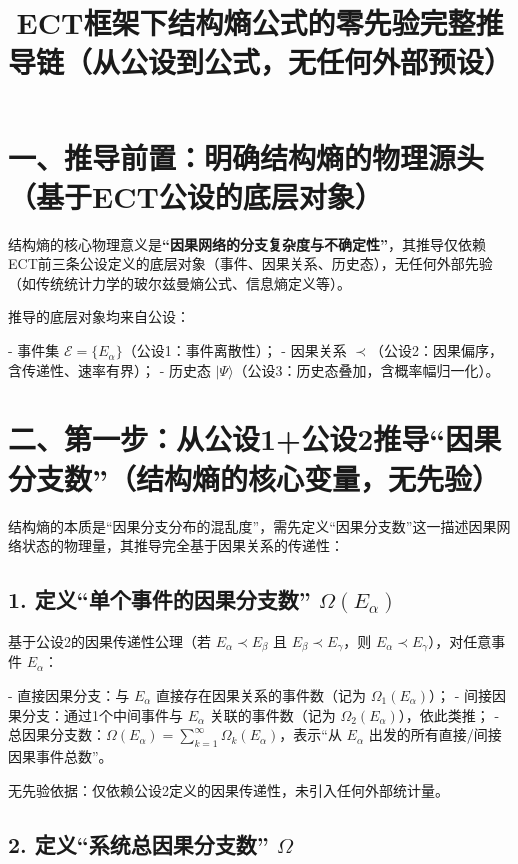 \documentclass{article}
\title{ECT框架下结构熵公式的零先验完整推导链（从公设到公式，无任何外部预设）}
\author{}
\date{}
\begin{document}
\maketitle

\section*{一、推导前置：明确结构熵的物理源头（基于ECT公设的底层对象）}

结构熵的核心物理意义是\textbf{“因果网络的分支复杂度与不确定性”}，其推导仅依赖ECT前三条公设定义的底层对象（事件、因果关系、历史态），无任何外部先验（如传统统计力学的玻尔兹曼熵公式、信息熵定义等）。

推导的底层对象均来自公设：

- 事件集 \( \mathcal{E} = \{E_\alpha\} \)（公设1：事件离散性）；
- 因果关系 \( \prec \)（公设2：因果偏序，含传递性、速率有界）；
- 历史态 \( |\Psi\rangle \)（公设3：历史态叠加，含概率幅归一化）。

\section*{二、第一步：从公设1+公设2推导“因果分支数”（结构熵的核心变量，无先验）}

结构熵的本质是“因果分支分布的混乱度”，需先定义“因果分支数”这一描述因果网络状态的物理量，其推导完全基于因果关系的传递性：

\subsection*{1. 定义“单个事件的因果分支数” \( \Omega(E_\alpha) \)}

基于公设2的因果传递性公理（若 \( E_\alpha \prec E_\beta \) 且 \( E_\beta \prec E_\gamma \)，则 \( E_\alpha \prec E_\gamma \)），对任意事件 \( E_\alpha \)：

- 直接因果分支：与 \( E_\alpha \) 直接存在因果关系的事件数（记为 \( \Omega_1(E_\alpha) \)）；
- 间接因果分支：通过1个中间事件与 \( E_\alpha \) 关联的事件数（记为 \( \Omega_2(E_\alpha) \)），依此类推；
- 总因果分支数：\( \Omega(E_\alpha) = \sum_{k=1}^\infty \Omega_k(E_\alpha) \)，表示“从 \( E_\alpha \) 出发的所有直接/间接因果事件总数”。

无先验依据：仅依赖公设2定义的因果传递性，未引入任何外部统计量。

\subsection*{2. 定义“系统总因果分支数” \( \Omega \)}
\end{document}
